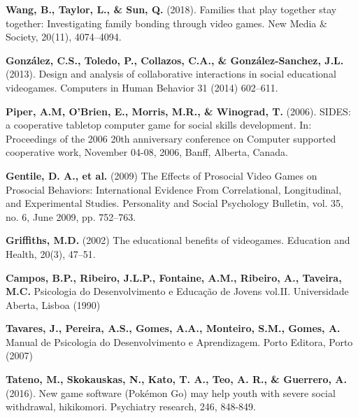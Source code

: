\documentclass[runningheads]{llncs}
\begin{document}
\begin{thebibliography}{8}

   \textbf{Wang, B., Taylor, L., \& Sun, Q.} (2018). Families that play together stay together: Investigating family bonding through video games. New Media \& Society, 20(11), 4074–4094. 

 \textbf{González, C.S., Toledo, P., Collazos, C.A., \& González-Sanchez, J.L.} (2013). Design and analysis of collaborative interactions in social educational videogames. Computers in Human Behavior 31 (2014) 602–611. 


 \textbf{Piper, A.M, O'Brien, E., Morris, M.R., \& Winograd, T.} (2006). SIDES: a cooperative tabletop computer game for social skills development. In: Proceedings of the 2006 20th anniversary conference on Computer supported cooperative work, November 04-08, 2006, Banff, Alberta, Canada. 

 \textbf{Gentile, D. A., et al.} (2009) The Effects of Prosocial Video Games on Prosocial Behaviors: International Evidence From Correlational, Longitudinal, and Experimental Studies. Personality and Social Psychology Bulletin, vol. 35, no. 6, June 2009, pp. 752–763. 

 \textbf{Griffiths, M.D.} (2002) The educational benefits of videogames. Education and Health, 20(3), 47–51.

 \textbf{Campos, B.P., Ribeiro, J.L.P., Fontaine, A.M., Ribeiro, A., Taveira, M.C.} Psicologia do Desenvolvimento e Educação de Jovens vol.II. Universidade Aberta, Lisboa (1990) 

 \textbf{Tavares, J., Pereira, A.S., Gomes, A.A., Monteiro, S.M., Gomes, A.} Manual de Psicologia do Desenvolvimento e Aprendizagem. Porto Editora, Porto (2007)

 	\textbf{Tateno, M., Skokauskas, N., Kato, T. A., Teo, A. R., \& Guerrero, A.} (2016). New game software (Pokémon Go) may help youth with severe social withdrawal, hikikomori. Psychiatry research, 246, 848-849. 


\end{thebibliography}
\end{document}
